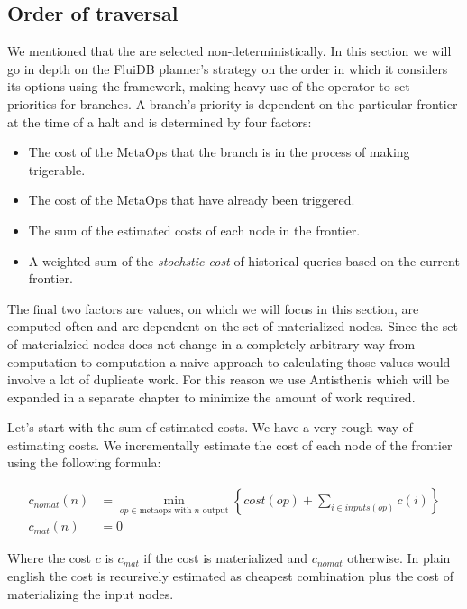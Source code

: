 \subsection{Order of traversal}
\label{sec:org2851b35}
We mentioned that the  are selected non-deterministically. In
this section we will go in depth on the FluiDB planner's strategy on
the order in which it considers its options using the 
framework, making heavy use of the  operator to set priorities
for branches. A branch's priority is dependent on the particular
frontier at the time of a halt and is determined by four factors:

\begin{itemize}
\item The cost of the MetaOps that the branch is in the process of making
trigerable.
\item The cost of the MetaOps that have already been triggered.
\item The sum of the estimated costs of each node in the frontier.
\item A weighted sum of the \emph{stochstic cost} of historical queries based
on the current frontier.
\end{itemize}

The final two factors are values, on which we will focus in this
section, are computed often and are dependent on the set of
materialized nodes. Since the set of materialzied nodes does not
change in a completely arbitrary way from computation to computation a
naive approach to calculating those values would involve a lot of
duplicate work. For this reason we use Antisthenis which will be
expanded in a separate chapter to minimize the amount of work
required.

Let's start with the sum of estimated costs. We have a very rough way
of estimating costs. We incrementally estimate the cost of each node
of the frontier using the following formula:

\begin{align}
  c_{nomat}(n) &=
    \min\limits_{op \in \text{metaops with \(n\) output}} \left\{ cost(op) + \sum\limits_{i \in inputs(op)} c(i)  \right\} \\
  c_{mat}(n) &= 0
\end{align}

Where the cost \(c\) is \(c_{mat}\) if the cost is materialized and
\(c_{nomat}\) otherwise. In plain english the cost is recursively
estimated as cheapest combination  plus the cost of
materializing the input nodes.

